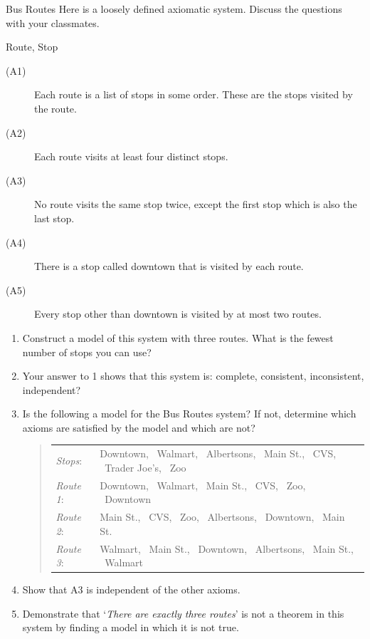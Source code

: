 \begin{example}{Bus Routes}{}
Here is a loosely defined axiomatic system. Discuss the questions with your classmates.
\begin{description}\itemsep0pt
	\item[\normalfont\emph{Undefined Terms}:] Route, Stop
	\item[\normalfont\emph{Axioms}:]\begin{description}
		\item[\normalfont (A1)] Each route is a list of stops in some order. These are the stops visited by the route.
		\item[\normalfont (A2)] Each route visits at least four distinct stops.
		\item[\normalfont (A3)] No route visits the same stop twice, except the first stop which is also the last stop.
		\item[\normalfont (A4)] There is a stop called downtown that is visited by each route.
		\item[\normalfont (A5)] Every stop other than downtown is visited by at most two routes.
	\end{description}
\end{description}

\begin{enumerate}
  \item Construct a model of this system with three routes. What is the fewest number of stops you can use?
  \item Your answer to 1 shows that this system is: complete, consistent, inconsistent, independent?
  \item Is the following a model for the Bus Routes system? If not, determine which axioms are satisfied by the model and which are not?
  \begin{quote}\def\arraystretch{1.2}
  \begin{tabular}{@{}ll}
    \emph{Stops}:&Downtown, \ Walmart, \ Albertsons, \ Main St., \ CVS, \ Trader Joe's, \ Zoo\\
  	\emph{Route 1}:&Downtown, \ Walmart, \ Main St., \ CVS, \ Zoo, \ Downtown\\
  	\emph{Route 2}:&Main St., \ CVS, \ Zoo, \ Albertsons, \ Downtown, \ Main St.\\
  	\emph{Route 3}:&Walmart, \ Main St., \ Downtown, \ Albertsons, \ Main St., \ Walmart
  \end{tabular}
  \end{quote}
	\item Show that A3 is independent of the other axioms.
	\item Demonstrate that `\emph{There are exactly three routes}' is not a theorem in this system by finding a model in which it is not true.
\end{enumerate}
\end{example}

